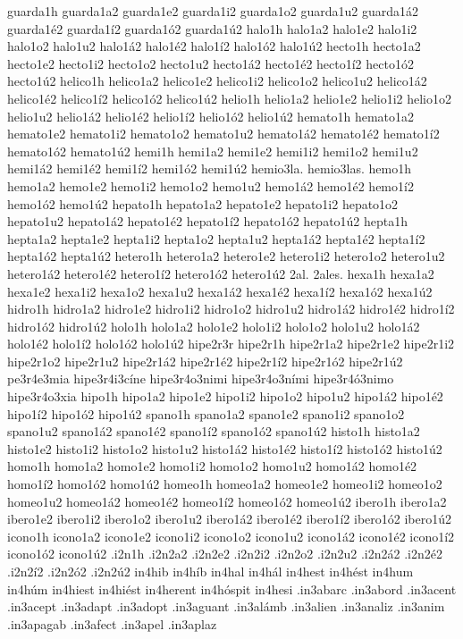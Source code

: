 {guarda1h
guarda1a2 guarda1e2 guarda1i2 guarda1o2 guarda1u2
guarda1á2 guarda1é2 guarda1í2 guarda1ó2 guarda1ú2
halo1h
halo1a2 halo1e2 halo1i2 halo1o2 halo1u2
halo1á2 halo1é2 halo1í2 halo1ó2 halo1ú2
hecto1h
hecto1a2 hecto1e2 hecto1i2 hecto1o2 hecto1u2
hecto1á2 hecto1é2 hecto1í2 hecto1ó2 hecto1ú2
helico1h
helico1a2 helico1e2 helico1i2 helico1o2 helico1u2
helico1á2 helico1é2 helico1í2 helico1ó2 helico1ú2
helio1h
helio1a2 helio1e2 helio1i2 helio1o2 helio1u2
helio1á2 helio1é2 helio1í2 helio1ó2 helio1ú2
hemato1h
hemato1a2 hemato1e2 hemato1i2 hemato1o2 hemato1u2
hemato1á2 hemato1é2 hemato1í2 hemato1ó2 hemato1ú2
hemi1h
hemi1a2 hemi1e2 hemi1i2 hemi1o2 hemi1u2
hemi1á2 hemi1é2 hemi1í2 hemi1ó2 hemi1ú2
hemio3la.
hemio3las.
hemo1h
hemo1a2 hemo1e2 hemo1i2 hemo1o2 hemo1u2
hemo1á2 hemo1é2 hemo1í2 hemo1ó2 hemo1ú2
hepato1h
hepato1a2 hepato1e2 hepato1i2 hepato1o2 hepato1u2
hepato1á2 hepato1é2 hepato1í2 hepato1ó2 hepato1ú2
hepta1h
hepta1a2 hepta1e2 hepta1i2 hepta1o2 hepta1u2
hepta1á2 hepta1é2 hepta1í2 hepta1ó2 hepta1ú2
hetero1h
hetero1a2 hetero1e2 hetero1i2 hetero1o2 hetero1u2
hetero1á2 hetero1é2 hetero1í2 hetero1ó2 hetero1ú2
2al.
2ales.
hexa1h
hexa1a2 hexa1e2 hexa1i2 hexa1o2 hexa1u2
hexa1á2 hexa1é2 hexa1í2 hexa1ó2 hexa1ú2
hidro1h
hidro1a2 hidro1e2 hidro1i2 hidro1o2 hidro1u2
hidro1á2 hidro1é2 hidro1í2 hidro1ó2 hidro1ú2
holo1h
holo1a2 holo1e2 holo1i2 holo1o2 holo1u2
holo1á2 holo1é2 holo1í2 holo1ó2 holo1ú2
hipe2r3r
hipe2r1h
hipe2r1a2 hipe2r1e2 hipe2r1i2 hipe2r1o2 hipe2r1u2
hipe2r1á2 hipe2r1é2 hipe2r1í2 hipe2r1ó2 hipe2r1ú2
pe3r4e3mia
hipe3r4i3cíne
hipe3r4o3nimi
hipe3r4o3ními
hipe3r4ó3nimo
hipe3r4o3xia
hipo1h
hipo1a2 hipo1e2 hipo1i2 hipo1o2 hipo1u2
hipo1á2 hipo1é2 hipo1í2 hipo1ó2 hipo1ú2
spano1h
spano1a2 spano1e2 spano1i2 spano1o2 spano1u2
spano1á2 spano1é2 spano1í2 spano1ó2 spano1ú2
histo1h
histo1a2 histo1e2 histo1i2 histo1o2 histo1u2
histo1á2 histo1é2 histo1í2 histo1ó2 histo1ú2
homo1h
homo1a2 homo1e2 homo1i2 homo1o2 homo1u2
homo1á2 homo1é2 homo1í2 homo1ó2 homo1ú2
homeo1h
homeo1a2 homeo1e2 homeo1i2 homeo1o2 homeo1u2
homeo1á2 homeo1é2 homeo1í2 homeo1ó2 homeo1ú2
ibero1h
ibero1a2 ibero1e2 ibero1i2 ibero1o2 ibero1u2
ibero1á2 ibero1é2 ibero1í2 ibero1ó2 ibero1ú2
icono1h
icono1a2 icono1e2 icono1i2 icono1o2 icono1u2
icono1á2 icono1é2 icono1í2 icono1ó2 icono1ú2
.i2n1h
.i2n2a2 .i2n2e2 .i2n2i2 .i2n2o2 .i2n2u2
.i2n2á2 .i2n2é2 .i2n2í2 .i2n2ó2 .i2n2ú2
in4hib
in4híb
in4hal
in4hál
in4hest
in4hést
in4hum
in4húm
in4hiest
in4hiést
in4herent
in4hóspit
in4hesi
.in3abarc
.in3abord
.in3acent
.in3acept
.in3adapt
.in3adopt
.in3aguant
.in3alámb
.in3alien
.in3analiz
.in3anim
.in3apagab
.in3afect
.in3apel
.in3aplaz
}
